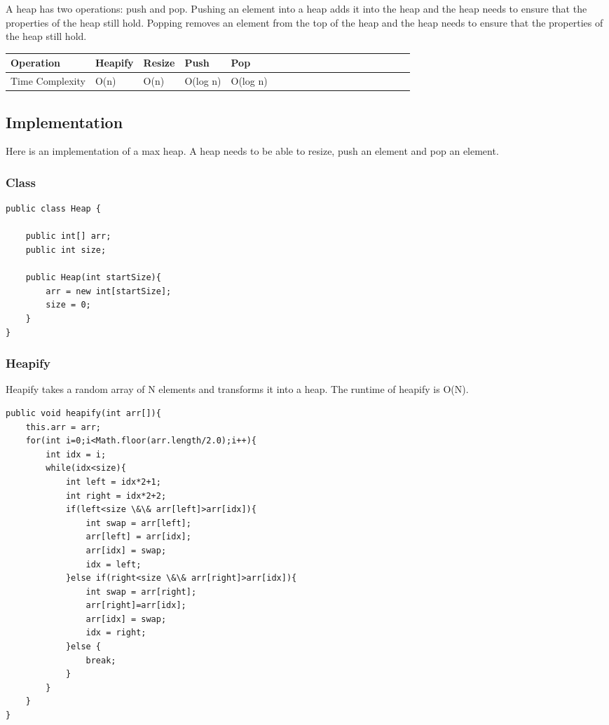 \documentclass[11pt,oneside]{book}
\begin{document}
A heap has two operations: push and pop. Pushing an element into a heap adds it into the heap and the heap needs to ensure that the properties of the heap still hold. Popping removes an element from the top of the heap and the heap needs to ensure that the properties of the heap still hold.

\vspace{10pt} \begin{tabulary}{0.4\linewidth}{|l|l|l|l|l|l|l|l|l|l|l|l|l|l|l|l|l|l|l}\hline


  Operation &
  Heapify &
  Resize &
  Push &
  Pop\\
\hline


  Time Complexity &
  O(n) &
  O(n) &
  O(log n) &
  O(log n)\\

\hline\end{tabulary}

\subsection{Implementation}

Here is an implementation of a max heap. A heap needs to be able to resize, push an element and pop an element.

\subsubsection{Class}

\begin{lstlisting}
public class Heap {

    public int[] arr;
    public int size;
    
    public Heap(int startSize){
        arr = new int[startSize];
        size = 0;
    }
}
\end{lstlisting}

\subsubsection{Heapify}

Heapify takes a random array of N elements and transforms it into a heap. The runtime of heapify is O(N).

\begin{lstlisting}
public void heapify(int arr[]){
    this.arr = arr;
    for(int i=0;i<Math.floor(arr.length/2.0);i++){
        int idx = i;
        while(idx<size){
            int left = idx*2+1;
            int right = idx*2+2;
            if(left<size \&\& arr[left]>arr[idx]){
                int swap = arr[left];
                arr[left] = arr[idx];
                arr[idx] = swap;
                idx = left;
            }else if(right<size \&\& arr[right]>arr[idx]){
                int swap = arr[right];
                arr[right]=arr[idx];
                arr[idx] = swap;
                idx = right;
            }else {
                break;
            }
        }
    }
}
\end{lstlisting}
\end{document}

